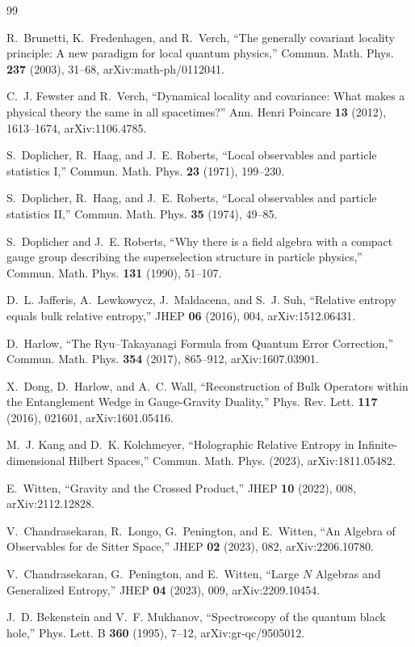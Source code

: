 \documentclass[12pt]{article}
\theoremstyle{definition}
\theoremstyle{remark}
\begin{document}
\begin{thebibliography}{99}

R.~Brunetti, K.~Fredenhagen, and R.~Verch,
``The generally covariant locality principle: A new paradigm for local quantum
physics,''
Commun. Math. Phys. \textbf{237} (2003), 31--68,
arXiv:math-ph/0112041.

C.~J. Fewster and R.~Verch,
``Dynamical locality and covariance: What makes a physical theory the same in
all spacetimes?''
Ann. Henri Poincare \textbf{13} (2012), 1613--1674,
arXiv:1106.4785.

S.~Doplicher, R.~Haag, and J.~E. Roberts,
``Local observables and particle statistics I,''
Commun. Math. Phys. \textbf{23} (1971), 199--230.

S.~Doplicher, R.~Haag, and J.~E. Roberts,
``Local observables and particle statistics II,''
Commun. Math. Phys. \textbf{35} (1974), 49--85.

S.~Doplicher and J.~E. Roberts,
``Why there is a field algebra with a compact gauge group describing the
superselection structure in particle physics,''
Commun. Math. Phys. \textbf{131} (1990), 51--107.

D.~L. Jafferis, A.~Lewkowycz, J.~Maldacena, and S.~J. Suh,
``Relative entropy equals bulk relative entropy,''
JHEP \textbf{06} (2016), 004,
arXiv:1512.06431.

D.~Harlow,
``The Ryu--Takayanagi Formula from Quantum Error Correction,''
Commun. Math. Phys. \textbf{354} (2017), 865--912,
arXiv:1607.03901.

X.~Dong, D.~Harlow, and A.~C. Wall,
``Reconstruction of Bulk Operators within the Entanglement Wedge in
Gauge-Gravity Duality,''
Phys. Rev. Lett. \textbf{117} (2016), 021601,
arXiv:1601.05416.

M.~J. Kang and D.~K. Kolchmeyer,
``Holographic Relative Entropy in Infinite-dimensional Hilbert Spaces,''
Commun. Math. Phys. (2023),
arXiv:1811.05482.

E.~Witten,
``Gravity and the Crossed Product,''
JHEP \textbf{10} (2022), 008,
arXiv:2112.12828.

V.~Chandrasekaran, R.~Longo, G.~Penington, and E.~Witten,
``An Algebra of Observables for de Sitter Space,''
JHEP \textbf{02} (2023), 082,
arXiv:2206.10780.

V.~Chandrasekaran, G.~Penington, and E.~Witten,
``Large \(N\) Algebras and Generalized Entropy,''
JHEP \textbf{04} (2023), 009,
arXiv:2209.10454.

J.~D. Bekenstein and V.~F. Mukhanov,
``Spectroscopy of the quantum black hole,''
Phys. Lett. B \textbf{360} (1995), 7--12,
arXiv:gr-qc/9505012.

\end{thebibliography}
\end{document}
